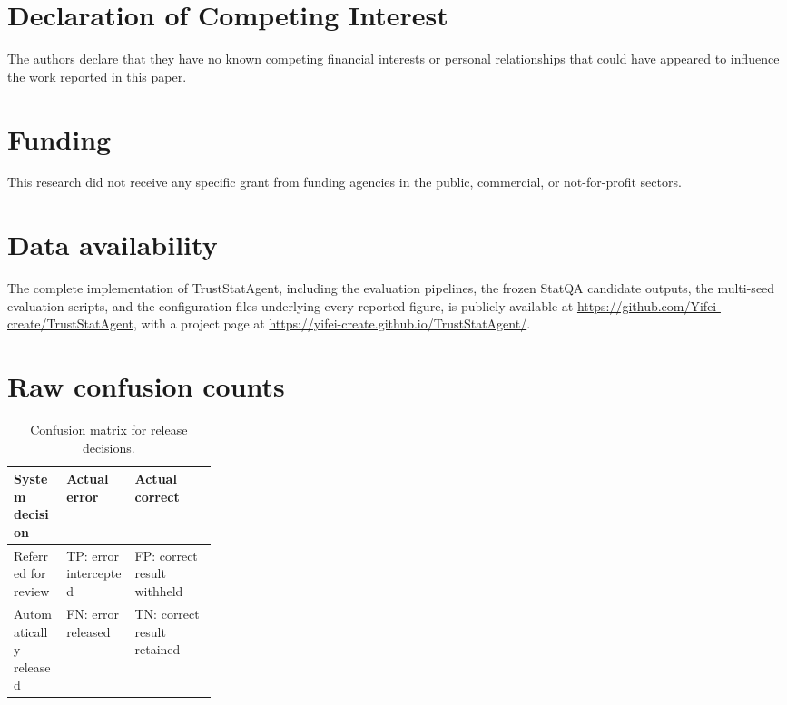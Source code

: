 \documentclass[preprint,12pt,authoryear]{elsarticle}
\begin{document}
\section*{Declaration of Competing Interest}
The authors declare that they have no known competing financial interests or personal relationships that could have appeared to influence the work reported in this paper.

\section*{Funding}
This research did not receive any specific grant from funding agencies in the public, commercial, or not-for-profit sectors.

\section*{Data availability}
The complete implementation of TrustStatAgent, including the evaluation pipelines, the frozen StatQA candidate outputs, the multi-seed evaluation scripts, and the configuration files underlying every reported figure, is publicly available at \url{https://github.com/Yifei-create/TrustStatAgent},
with a project page at \url{https://yifei-create.github.io/TrustStatAgent/}.

\appendix

\section{Raw confusion counts}
\label{app:counts}

\begin{table}[H]
    \centering
    \caption{Confusion matrix for release decisions.}
    \label{tab:exp_release_confusion}
    \small
    \renewcommand{\arraystretch}{1.2}
    \begin{tabularx}{\linewidth}{
        @{}
        >{\raggedright\arraybackslash}p{0.26\linewidth}
        >{\raggedright\arraybackslash}X
        >{\raggedright\arraybackslash}X
        @{}
    }
        \toprule
        \textbf{System decision}
        & \textbf{Actual error}
        & \textbf{Actual correct} \\
        \midrule
        Referred for review
        & TP: error intercepted
        & FP: correct result withheld \\
        Automatically released
        & FN: error released
        & TN: correct result retained \\
        \bottomrule
    \end{tabularx}
\end{table}
\end{document}
